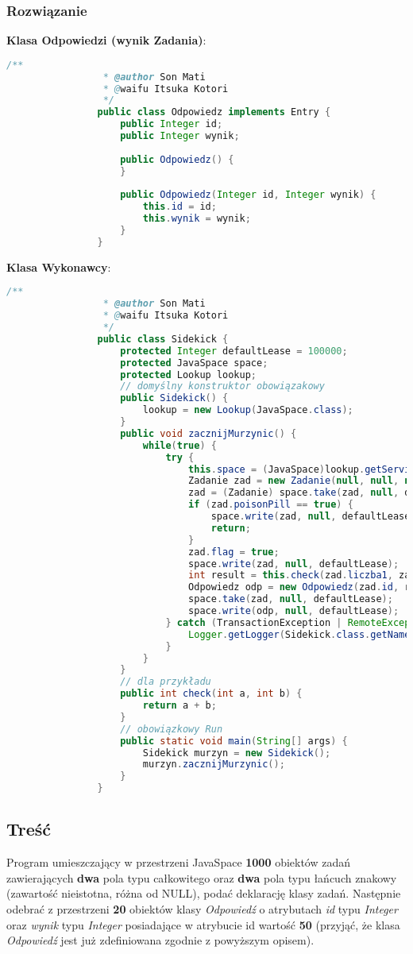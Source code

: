 		\subsubsection{Rozwiązanie}
			\textbf{Klasa Odpowiedzi (wynik Zadania)}:
			\begin{lstlisting}[language=Java]
				/**
				 * @author Son Mati
				 * @waifu Itsuka Kotori
				 */
				public class Odpowiedz implements Entry {
					public Integer id;
					public Integer wynik;
					
					public Odpowiedz() {
					}
					
					public Odpowiedz(Integer id, Integer wynik) {
						this.id = id;
						this.wynik = wynik;
					}
				}
			\end{lstlisting}
			\newpage
			\textbf{Klasa Wykonawcy}:
			\begin{lstlisting}[language=Java]
				/**
				 * @author Son Mati
				 * @waifu Itsuka Kotori
				 */
				public class Sidekick {
					protected Integer defaultLease = 100000;
					protected JavaSpace space;
					protected Lookup lookup;
					// domyślny konstruktor obowiązakowy
					public Sidekick() {
						lookup = new Lookup(JavaSpace.class);
					}
					public void zacznijMurzynic() {
						while(true) {
							try {
								this.space = (JavaSpace)lookup.getService();
								Zadanie zad = new Zadanie(null, null, null, false, null);
								zad = (Zadanie) space.take(zad, null, defaultLease);
								if (zad.poisonPill == true) {
									space.write(zad, null, defaultLease);
									return;
								}
								zad.flag = true;
								space.write(zad, null, defaultLease);
								int result = this.check(zad.liczba1, zad.liczba2);
								Odpowiedz odp = new Odpowiedz(zad.id, result);
								space.take(zad, null, defaultLease);    // pełen wzorzec
								space.write(odp, null, defaultLease);
							} catch (TransactionException | RemoteException | UnusableEntryException | InterruptedException ex) {
								Logger.getLogger(Sidekick.class.getName()).log(Level.SEVERE, null, ex);
							}
						}
					}
					// dla przykładu
					public int check(int a, int b) {
						return a + b;
					}
					// obowiązkowy Run
					public static void main(String[] args) {
						Sidekick murzyn = new Sidekick();
						murzyn.zacznijMurzynic();
					}
				}
			\end{lstlisting}
	\newpage
	\subsection{Treść}
		Program umieszczający w przestrzeni JavaSpace \textbf{1000} obiektów zadań zawierających \textbf{dwa} pola typu całkowitego oraz \textbf{dwa} pola typu łańcuch znakowy (zawartość nieistotna, różna od NULL), podać deklarację klasy zadań. Następnie odebrać z przestrzeni \textbf{20} obiektów klasy \textit{Odpowiedź} o atrybutach \textit{id} typu \textit{Integer} oraz \textit{wynik} typu \textit{Integer} posiadające w atrybucie id wartość \textbf{50} (przyjąć, że klasa \textit{Odpowiedź} jest już zdefiniowana zgodnie z powyższym opisem).
